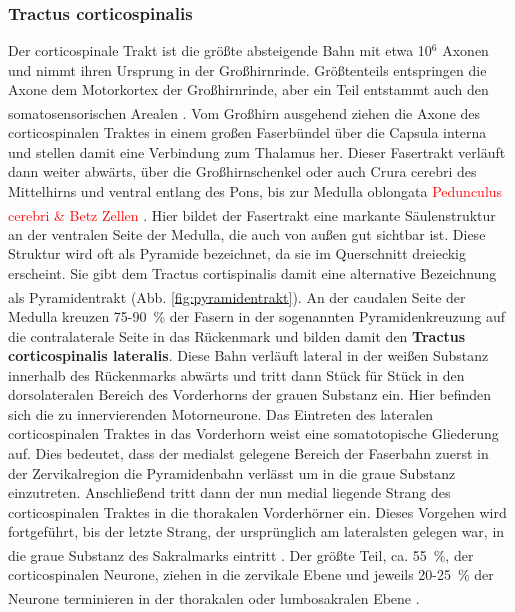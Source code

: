 \documentclass[12pt,a4paper,pdftex]{article}
\begin{document}
\subsubsection{Tractus corticospinalis} 
Der corticospinale Trakt ist die größte absteigende Bahn mit etwa 10$^{6}$ Axonen und nimmt ihren Ursprung in der Großhirnrinde. Größtenteils entspringen die Axone dem Motorkortex der Großhirnrinde, aber ein Teil entstammt auch den somatosensorischen Arealen \textsuperscript{\cite[14]{neurowissenschaften_baer}}. 
Vom Großhirn ausgehend ziehen die Axone des corticospinalen Traktes in einem großen Faserbündel über die Capsula interna und stellen damit eine Verbindung zum Thalamus her. Dieser Fasertrakt verläuft dann weiter abwärts, über die Großhirnschenkel oder auch Crura cerebri des Mittelhirns und ventral entlang des Pons, bis zur Medulla oblongata \textcolor{red}{Pedunculus cerebri \& Betz Zellen} \textsuperscript{\cite[8]{crossman2014neuroanatomy}}. Hier bildet der Fasertrakt eine markante Säulenstruktur an der ventralen Seite der Medulla, die auch von außen gut sichtbar ist. Diese Struktur wird oft als Pyramide bezeichnet, da sie im Querschnitt dreieckig erscheint. Sie gibt dem Tractus cortispinalis damit eine alternative Bezeichnung als Pyramidentrakt  \textsuperscript{\cite[14]{neurowissenschaften_baer}} (Abb. \ref{fig:pyramidentrakt}). An der caudalen Seite der Medulla kreuzen 75-90~\% der Fasern in der sogenannten Pyramidenkreuzung auf die contralaterale Seite in das Rückenmark und bilden damit den \textbf{Tractus corticospinalis lateralis}. Diese Bahn verläuft lateral in der weißen Substanz innerhalb des Rückenmarks abwärts und tritt dann Stück für Stück in den dorsolateralen Bereich des Vorderhorns der grauen Substanz ein. Hier befinden sich die zu innervierenden Motorneurone. Das Eintreten des lateralen corticospinalen Traktes in das Vorderhorn weist eine somatotopische Gliederung auf. Dies bedeutet, dass der medialst gelegene Bereich der Faserbahn zuerst in der Zervikalregion die Pyramidenbahn verlässt um in die graue Substanz einzutreten. Anschließend tritt dann der nun medial liegende Strang des corticospinalen Traktes in die thorakalen Vorderhörner ein. Dieses Vorgehen wird fortgeführt, bis der letzte Strang, der ursprünglich am lateralsten gelegen war, in die graue Substanz des Sakralmarks eintritt \textsuperscript{\cite[3]{trepel2011neuroanatomie}}. Der größte Teil, ca. 55~\%, der corticospinalen Neurone, ziehen in die zervikale Ebene und jeweils 20-25~\% der Neurone terminieren in der thorakalen oder lumbosakralen Ebene \textsuperscript{\cite[8]{crossman2014neuroanatomy}}. \\
\end{document}
